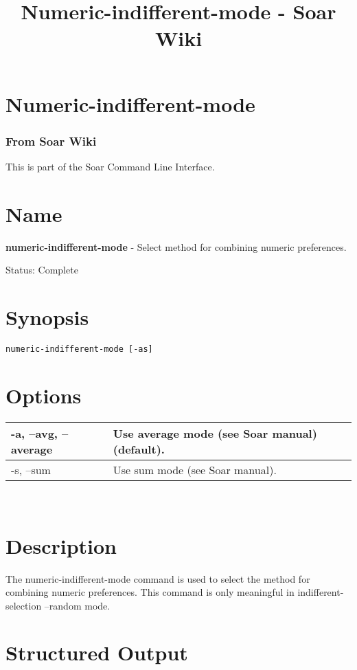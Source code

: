 \documentclass[10pt]{article}
\title{Numeric-indifferent-mode - Soar Wiki}
\begin{document}
\section*{Numeric-indifferent-mode}
\subsubsection*{From Soar Wiki}


 This is part of the Soar Command Line Interface. 
\section*{ Name }


 \textbf{numeric-indifferent-mode}
 - Select method for combining numeric preferences. 


 Status: Complete
\section*{ Synopsis }
\begin{verbatim}
numeric-indifferent-mode [-as]

\end{verbatim}
\section*{ Options }


\begin{tabular}{|p{1in}|p{5in}|}
\hline 
 -a, --avg, --average  & Use average mode (see Soar manual) (default).  \\
 \hline 
 -s, --sum  & Use sum mode (see Soar manual).  \\
 \hline 

\end{tabular}



 \\ 

\section*{ Description }


 The numeric-indifferent-mode command is used to select the method for combining numeric preferences. This command is only meaningful in indifferent-selection --random  mode. 
\section*{ Structured Output }
\end{document}
